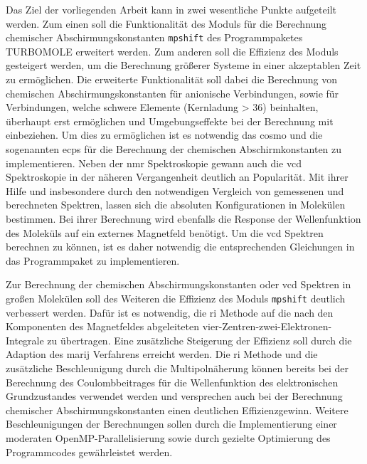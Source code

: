 \bigskip
Das Ziel der vorliegenden Arbeit kann in zwei wesentliche Punkte aufgeteilt werden. Zum einen soll die Funktionalität des Moduls für die Berechnung chemischer Abschirmungskonstanten \texttt{mpshift}\supercite{haser1992direct,kollwitz1996direct} des Programmpaketes \textsc{TURBOMOLE}\supercite{ahlrichs1989electronic,TURBOMOLE,furche2014turbomole} erweitert werden. Zum anderen soll die Effizienz des Moduls gesteigert werden, um die Berechnung größerer Systeme in einer akzeptablen Zeit zu ermöglichen. Die erweiterte Funktionalität soll dabei die Berechnung von chemischen Abschirmungskonstanten für anionische Verbindungen, sowie für Verbindungen, welche schwere Elemente (Kernladung > 36) beinhalten, überhaupt erst ermöglichen und Umgebungseffekte bei der Berechnung mit einbeziehen. Um dies zu ermöglichen ist es notwendig das \ac{cosmo}\supercite{klamt1993cosmo} und die sogenannten \acp{ecp} für die Berechnung der chemischen Abschirmkonstanten zu implementieren. Neben der \ac{nmr} Spektroskopie gewann auch die \ac{vcd} Spektroskopie in der näheren Vergangenheit deutlich an Popularität. Mit ihrer Hilfe und insbesondere durch den notwendigen Vergleich von gemessenen und berechneten Spektren, lassen sich die absoluten Konfigurationen in Molekülen bestimmen. Bei ihrer Berechnung wird ebenfalls die Response der Wellenfunktion des Moleküls auf ein externes Magnetfeld benötigt. Um die \ac{vcd} Spektren berechnen zu können, ist es daher notwendig die entsprechenden Gleichungen in das Programmpaket zu implementieren. 

Zur Berechnung der chemischen Abschirmungskonstanten oder \ac{vcd} Spektren in großen Molekülen soll des Weiteren die Effizienz des Moduls \texttt{mpshift} deutlich verbessert werden. Dafür ist es notwendig, die \ac{ri} Methode auf die nach den Komponenten des Magnetfeldes abgeleiteten vier-Zentren-zwei-Elektronen-Integrale zu übertragen. Eine zusätzliche Steigerung der Effizienz soll durch die Adaption des \ac{marij} Verfahrens\supercite{sierka2003fast} erreicht werden. Die \ac{ri} Methode und die zusätzliche Beschleunigung durch die Multipolnäherung können bereits bei der Berechnung des Coulombbeitrages für die Wellenfunktion des elektronischen Grundzustandes verwendet werden und versprechen auch bei der Berechnung chemischer Abschirmungskonstanten einen deutlichen Effizienzgewinn. Weitere Beschleunigungen der Berechnungen sollen durch die Implementierung einer moderaten OpenMP-Parallelisierung sowie durch gezielte Optimierung des Programmcodes gewährleistet werden. 

